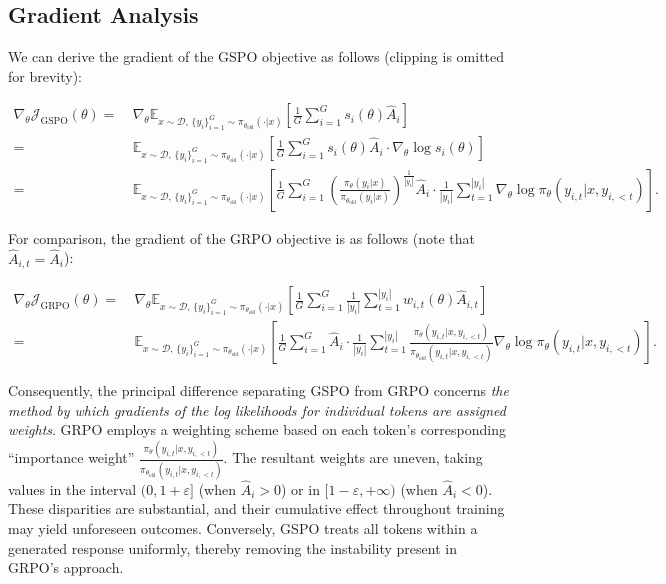 \subsection{Gradient Analysis}
\label{subsec:gradient}

We can derive the gradient of the GSPO objective as follows (clipping is omitted for brevity):

\begin{align}
\nabla_{\theta} \mathcal{J}_\text{GSPO} (\theta)
=&\ 
\nabla_{\theta} \mathbb{E}_{ x \sim \mathcal{D},\, \{y_i\}_{i=1}^G \sim \pi_{\theta_\text{old}}( \cdot | x) }
\left[ 
\frac{1}{G} \sum_{i=1}^{G} s_{i}(\theta) \widehat{A}_{i}
\right] \\
= &\ 
\mathbb{E}_{ x \sim \mathcal{D},\, \{y_i\}_{i=1}^G \sim \pi_{\theta_\text{old}}( \cdot | x) }
\left[ 
\frac{1}{G} \sum_{i=1}^{G}
s_{i}(\theta) \widehat{A}_{i}
\cdot \nabla_{\theta} \log s_{i}(\theta)
\right] \\
=&\ 
\mathbb{E}_{ x \sim \mathcal{D},\, \{y_i\}_{i=1}^G \sim \pi_{\theta_\text{old}}( \cdot | x) }
\left[ 
\frac{1}{G} \sum_{i=1}^{G} 
\left( \frac{ \pi_{\theta} (y_i | x) }{ \pi_{\theta_\text{old}} (y_i | x)} \right)^{\frac{1}{|y_i|}} \widehat{A}_{i} 
\cdot \frac{1}{|y_i|} \sum_{t=1}^{|y_i|} \nabla_{\theta} \log \pi_{\theta} (y_{i,t} | x, y_{i,<t}) 
\right].
\label{equ:gspo_grad}
\end{align}

For comparison, the gradient of the GRPO objective is as follows (note that $\widehat{A}_{i,t} = \widehat{A}_{i}$):

\begin{align}
\nabla_{\theta} \mathcal{J}_\text{GRPO} (\theta) 
=&\ 
\nabla_{\theta} \mathbb{E}_{ x \sim \mathcal{D},\, \{y_i\}_{i=1}^G \sim \pi_{\theta_\text{old}}( \cdot | x) }
\left[ \frac{1}{G} \sum_{i=1}^{G} \frac{1}{|y_i|} \sum_{t=1}^{|y_i|} 
w_{i,t}(\theta) \widehat{A}_{i,t}
\right] \\
=&\
\mathbb{E}_{ x \sim \mathcal{D},\, \{y_i\}_{i=1}^G \sim \pi_{\theta_\text{old}}( \cdot | x) }
\left[ \frac{1}{G} \sum_{i=1}^{G} \widehat{A}_{i} 
\cdot \frac{1}{|y_i|} \sum_{t=1}^{|y_i|} 
\frac{ \pi_{\theta} (y_{i,t} | x, y_{i,<t}) }{ \pi_{\theta_\text{old}} (y_{i,t} | x,y_{i,<t})} 
\nabla_{\theta} \log \pi_{\theta} (y_{i,t} | x, y_{i,<t})  
\right].
\end{align}

Consequently, the principal difference separating GSPO from GRPO concerns \textit{the method by which gradients of the log likelihoods for individual tokens are assigned weights}. GRPO employs a weighting scheme based on each token’s corresponding “importance weight” $\frac{ \pi_{\theta} (y_{i,t} | x, y_{i,<t}) }{ \pi_{\theta_\text{old}} (y_{i,t} | x,y_{i,<t})}$. The resultant weights are uneven, taking values in the interval $(0, 1+\varepsilon]$ (when $\widehat{A}_{i} >0$) or in $[1-\varepsilon, +\infty)$ (when $\widehat{A}_{i} < 0$). These disparities are substantial, and their cumulative effect throughout training may yield unforeseen outcomes. Conversely, GSPO treats all tokens within a generated response uniformly, thereby removing the instability present in GRPO’s approach.

